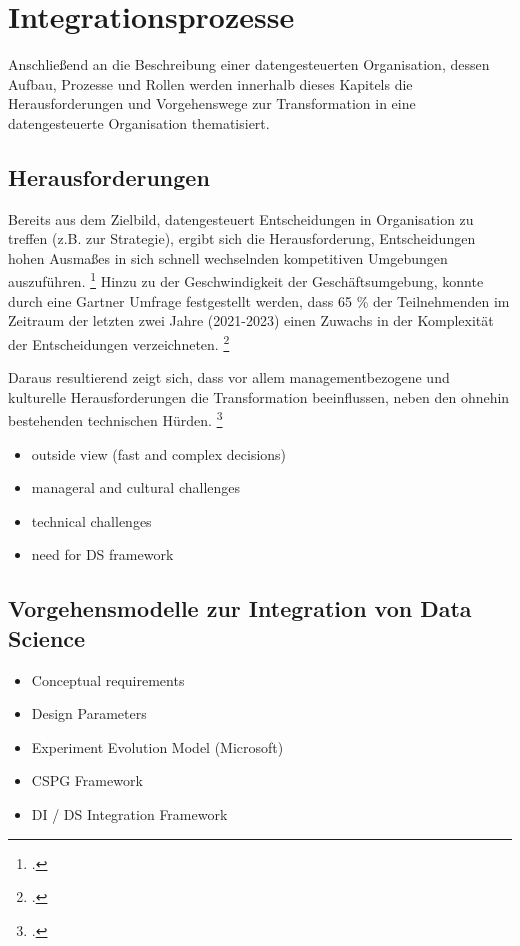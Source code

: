 \chapter[Integrationsprozesse]{Integrationsprozesse}

Anschließend an die Beschreibung einer datengesteuerten Organisation, dessen Aufbau, Prozesse und Rollen werden innerhalb dieses Kapitels die Herausforderungen und Vorgehenswege zur Transformation in eine datengesteuerte Organisation thematisiert.

\section{Herausforderungen}

Bereits aus dem Zielbild, datengesteuert Entscheidungen in Organisation zu treffen (z.B. zur Strategie), ergibt sich die Herausforderung, Entscheidungen hohen Ausmaßes in sich schnell wechselnden kompetitiven Umgebungen auszuführen. \footcite[Vgl.][S. 2]{Pratt.2023} 
Hinzu zu der Geschwindigkeit der Geschäftsumgebung, konnte durch eine Gartner Umfrage festgestellt werden, dass 65 \% der Teilnehmenden im Zeitraum der letzten zwei Jahre (2021-2023) einen Zuwachs in der Komplexität der Entscheidungen verzeichneten. \footcite[Vgl.][S. 65]{Pratt.2023}

Daraus resultierend zeigt sich, dass vor allem managementbezogene und kulturelle Herausforderungen die Transformation beeinflussen, neben den ohnehin bestehenden technischen Hürden. \footcite[Vgl.][S. 15]{Dalpiaz.2020}

\begin{itemize}
    \item outside view (fast and complex decisions)
    \item manageral and cultural challenges
    \item technical challenges
    \item need for DS framework
\end{itemize}

\section{Vorgehensmodelle zur Integration von Data Science}

\begin{itemize}
    \item Conceptual requirements
    \item Design Parameters
    \item Experiment Evolution Model (Microsoft)
    \item CSPG Framework
    \item DI / DS Integration Framework
\end{itemize}